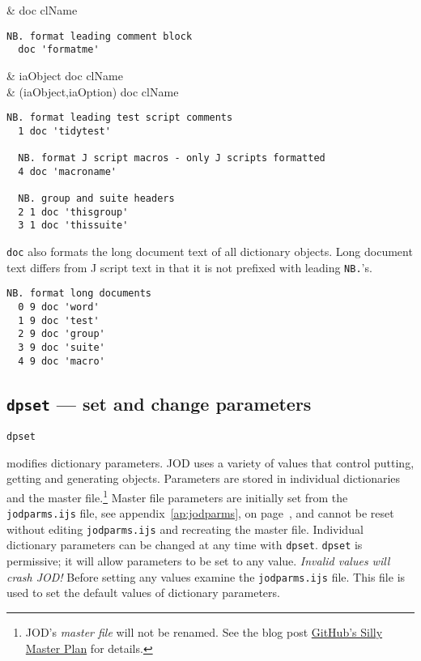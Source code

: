 \begin{wordhead}
\monad & doc clName \\
\end{wordhead}
\begin{lstlisting}[frame=single,framerule=0pt]
  NB. format leading comment block 
  doc 'formatme' 
\end{lstlisting}

\begin{wordhead}
\dyad & iaObject doc clName  \\
      & (iaObject,iaOption) doc clName \\
\end{wordhead}
\begin{lstlisting}[frame=single,framerule=0pt]
  NB. format leading test script comments
  1 doc 'tidytest'
  
  NB. format J script macros - only J scripts formatted
  4 doc 'macroname'
  
  NB. group and suite headers
  2 1 doc 'thisgroup'
  3 1 doc 'thissuite'
\end{lstlisting} 
  
\texttt{doc} also formats the long document text of all dictionary objects.
Long document text differs from J script
text in that it is not prefixed with leading \verb|NB.|'s.
  
\begin{lstlisting}[frame=single,framerule=0pt]
  NB. format long documents
  0 9 doc 'word'
  1 9 doc 'test'
  2 9 doc 'group'
  3 9 doc 'suite'
  4 9 doc 'macro'
\end{lstlisting}  


\subsection{\texttt{dpset} --- set and change parameters}\label{ss:dpset}

\hypertarget{il:dpset}{\texttt{dpset}} modifies dictionary parameters. JOD uses a 
variety of values that control putting, getting and generating objects. 
Parameters are stored in individual dictionaries and 
the master file.\footnote{
  JOD's \textit{master file} will not be renamed. See the blog post
  \href{https://analyzethedatanotthedrivel.org/2020/06/20/githubs-silly-master-plan/}{GitHub's Silly Master Plan} for details.
} Master file parameters are initially 
set from the \verb|jodparms.ijs| file, see appendix~\ref{ap:jodparms}, on
page~\pageref{ap:jodparms}, and cannot be reset without 
editing \verb|jodparms.ijs| and recreating the master file. Individual 
dictionary parameters can be changed at any time with \texttt{dpset}. \texttt{dpset} is permissive; 
it will allow parameters to be set to any value. \emph{Invalid values will 
crash JOD!} Before setting any values examine the \verb|jodparms.ijs| file. 
This file is used to set the default values of dictionary parameters. 

